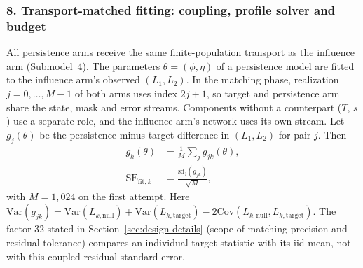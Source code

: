 \subsubsection*{8. Transport-matched fitting: coupling, profile solver and budget}
All persistence arms receive the same finite-population transport as the influence arm (Submodel~4). The parameters $\theta=(\phi,\eta)$ of a persistence model are fitted to the influence arm's observed $(L_1,L_2)$. In the matching phase, realization $j=0,\ldots,M-1$ of both arms uses index $2j+1$, so target and persistence arm share the state, mask and error streams. Components without a counterpart ($T$, $s$) use a separate  role, and the influence arm's network uses its own stream. Let $g_j(\theta)$ be the persistence-minus-target difference in $(L_1,L_2)$ for pair $j$. Then
\begin{align*}
\bar g_k(\theta)&=\frac1M\sum_j g_{jk}(\theta),\\
\mathrm{SE}_{\mathrm{fit},k}&=\frac{\mathrm{sd}_j(g_{jk})}{\sqrt M},
\end{align*}
with $M=1{,}024$ on the first attempt.
Here $\mathrm{Var}(g_{jk})=\mathrm{Var}(L_{k,\mathrm{null}})+\mathrm{Var}(L_{k,\mathrm{target}})-2\mathrm{Cov}(L_{k,\mathrm{null}},L_{k,\mathrm{target}})$. The factor 32 stated in Section~\ref{sec:design-details} (scope of matching precision and residual tolerance) compares an individual target statistic with its iid mean, not with this coupled residual standard error. %

